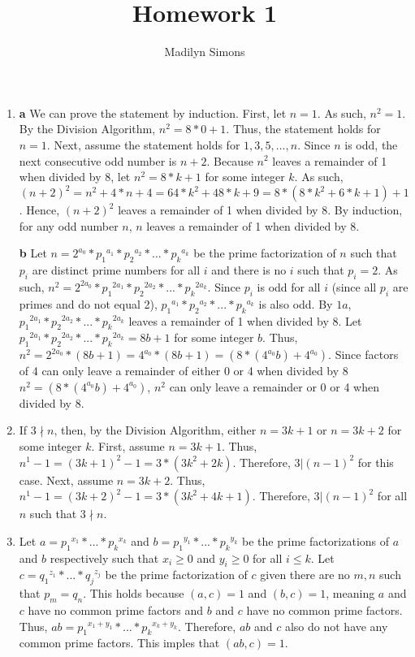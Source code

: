 \documentclass{article}
\title{Homework 1}
\author{Madilyn Simons}
\date{}
\begin{document}
\maketitle

\begin{enumerate}

\item \textbf{a} We can prove the statement by induction.  First, let $n = 1$.  As such, $n^2 = 1$.  By the Division Algorithm, $n^2 = 8*0 + 1$.  Thus, the statement holds for $n = 1$.  Next, assume the statement holds for $1, 3, 5, ..., n$.  Since $n$ is odd, the next consecutive odd number is $n+2$.  Because $n^2$ leaves a remainder of 1 when divided by 8, let $n^2 = 8*k + 1$ for some integer $k$.  As such, $(n+2)^2 = n^2 + 4*n + 4 = 64*k^2 + 48*k + 9 = 8 * (8*k^2 + 6*k + 1) + 1$.  Hence, $(n+2)^2$ leaves a remainder of 1 when divided by 8.  By induction, for any odd number $n$, $n$ leaves a remainder of 1 when divided by 8.

\textbf{b} Let $n = 2^{a_0} * {p_1}^{a_1} * {p_2}^{a_2} * ... * {p_k}^{a_k}$ be the prime factorization of $n$ such that $p_i$ are distinct prime numbers for all $i$ and there is no $i$ such that $p_i = 2$.  As such, $n^2 = 2^{2a_0} * {p_1}^{2a_1} * {p_2}^{2a_2} * ... * {p_k}^{2a_k}$.  Since $p_i$ is odd for all $i$ (since all $p_i$ are primes and do not equal 2), ${p_1}^{a_1} * {p_2}^{a_2} * ... * {p_k}^{a_k}$ is also odd.  By $1a$, ${p_1}^{2a_1} * {p_2}^{2a_2} * ... * {p_k}^{2a_k}$ leaves a remainder of 1 when divided by 8.  Let ${p_1}^{2a_1} * {p_2}^{2a_2} * ... * {p_k}^{2a_k} = 8b + 1$ for some integer $b$.  Thus, $n^2 = 2^{2a_0} * (8b + 1) = 4^{a_0} * (8b + 1) = (8 * (4^{a_0}b) + 4^{a_0}).$  Since factors of 4 can only leave a remainder of either 0 or 4 when divided by 8 $n^2 = (8 * (4^{a_0}b) + 4^{a_0})$, $n^2$ can only leave a remainder or 0 or 4 when divided by 8.

\item If $3 \nmid n$, then, by the Division Algorithm, either $n = 3k + 1$ or $n = 3k + 2$ for some integer $k$.  First, assume $n = 3k + 1$.  Thus, $n^1 - 1 = (3k + 1)^2 - 1 = 3 * (3k^2 + 2k)$.  Therefore, $3 \vert (n - 1)^2$ for this case.  Next, assume $n = 3k + 2$.  Thus, $n^1 - 1 = (3k + 2)^2 - 1 = 3 * (3k^2 + 4k + 1)$.  Therefore, $3 \vert (n - 1)^2$ for all $n$ such that $3 \nmid n$.

\item Let $a = {p_1}^{x_1} * ... * {p_k}^{x_k}$ and $b = {p_1}^{y_1} * ... * {p_k}^{y_k}$ be the prime factorizations of $a$ and $b$ respectively such that $x_i \geq 0$ and $y_i \geq 0$ for all $i \leq k$.  Let $c = {q_1}^{z_1} * ... * {q_j}^{z_j}$ be the prime factorization of $c$ given there are no $m, n$ such that $p_m = q_n$.  This holds because $(a, c) = 1$ and $(b, c) = 1$, meaning $a$ and $c$ have no common prime factors and $b$ and $c$ have no common prime factors.  Thus, $ab = {p_1}^{x_1 + y_1} * ... * {p_k}^{x_k + y_k}$.  Therefore, $ab$ and $c$ also do not have any common prime factors.  This imples that $(ab, c) = 1$.


\end{enumerate}
\end{document}
